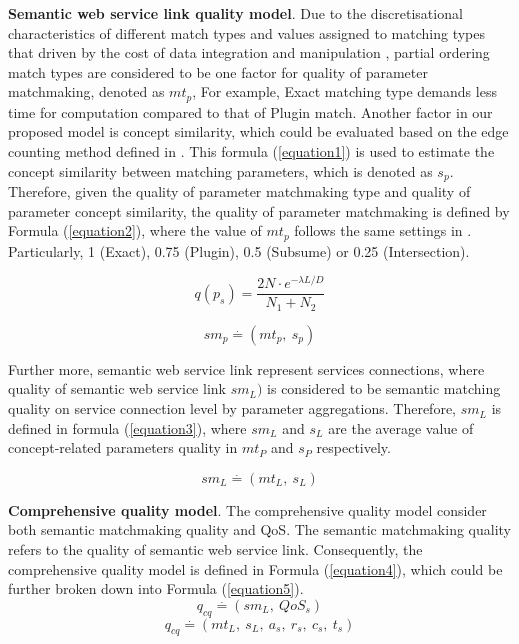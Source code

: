 \documentclass{IEEEtran}
\begin{document}
\textbf{Semantic web service link quality model}. Due to the discretisational characteristics of different match types and values assigned to matching types that driven by the cost of data integration and manipulation \cite{lecue2009optimizing}, partial ordering match types are considered to be one factor for quality of parameter matchmaking, denoted as $mt_{p}$,  For example, Exact matching type demands less time for computation compared to that of Plugin match. Another factor in our proposed model is concept similarity, which could be evaluated based on the edge counting method defined in \cite{shet2012new}. This formula (\ref{equation1}) is used to estimate the concept similarity between matching parameters, which is denoted as $s_{p}$. Therefore, given the quality of parameter matchmaking type and quality of parameter concept similarity, the quality of parameter matchmaking is defined by Formula (\ref{equation2}), where the value of $mt_{p}$ follows the same settings in \cite{lecue2009optimizing}. Particularly, 1 (Exact), 0.75 (Plugin), 0.5 (Subsume) or 0.25 (Intersection). 

\begin{equation}
q(p_ {s}){=} \frac{2N \cdot e^{-\lambda L/D} }{N_{1}+N_{2}}
\label{equation1}
\end{equation}

\begin{equation}
\label{equation2}
sm_{p} \stackrel{.}{=} (mt_ {p}, \  s_ {p})
\end{equation}

Further more, semantic web service link represent services connections, where quality of semantic web service link $sm_{L})$ is considered to be semantic matching quality on service connection level by parameter aggregations. Therefore, $sm_{L}$ is defined in formula (\ref{equation3}), where $sm_{L}$ and $s_{L}$ are the average value of concept-related parameters quality in $mt_{P}$ and $s_{P}$ respectively. 

\begin{equation}
\label{equation3}
sm_{L} \stackrel{.}{=} (mt_ {L}, \  s_ {L})
\end{equation}

\textbf{Comprehensive quality model}. The comprehensive quality model consider both semantic matchmaking quality and QoS. The semantic matchmaking quality refers to the quality of semantic web service link. Consequently, the comprehensive quality model is defined in Formula (\ref{equation4}), which could be further broken down into Formula (\ref{equation5}). 
\begin{equation}
\label{equation4}
q_{cq} \stackrel{.}{=} (sm_ {L}, \  QoS_ {s})
\end{equation}
\begin{equation}
\label{equation5}
q_{cq} \stackrel{.}{=} (mt_ {L}, \  s_ {L}, \  a_{s},\  r_{s},\  c_{s},\  t_{s})
\end{equation}
\end{document}

